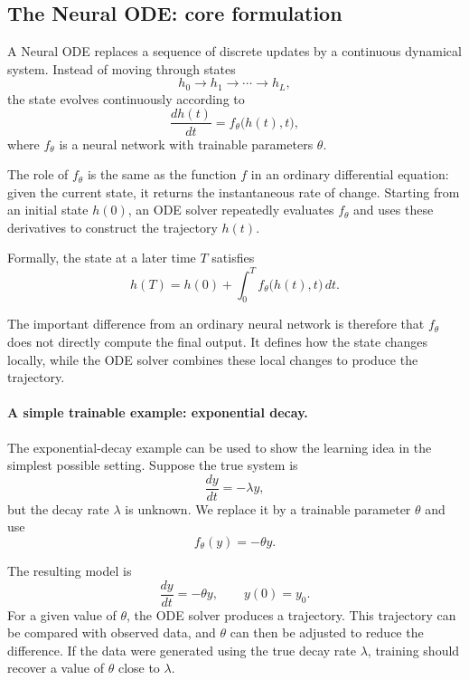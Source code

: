 \documentclass[11pt,a4paper]{article}
\begin{document}
\subsection{The Neural ODE: core formulation}

A Neural ODE replaces a sequence of discrete updates by a continuous
dynamical system. Instead of moving through states
\[
    h_0 \to h_1 \to \cdots \to h_L,
\]
the state evolves continuously according to
\begin{equation}
    \frac{dh(t)}{dt}
    =
    f_\theta\bigl(h(t),t\bigr),
    \label{eq:node}
\end{equation}
where $f_\theta$ is a neural network with trainable parameters $\theta$.

The role of $f_\theta$ is the same as the function $f$ in an ordinary
differential equation: given the current state, it returns the instantaneous
rate of change. Starting from an initial state $h(0)$, an ODE solver repeatedly
evaluates $f_\theta$ and uses these derivatives to construct the trajectory
$h(t)$.

Formally, the state at a later time $T$ satisfies
\begin{equation}
    h(T)
    =
    h(0)
    +
    \int_0^T
    f_\theta\bigl(h(t),t\bigr)\,dt .
    \label{eq:odesolve}
\end{equation}

The important difference from an ordinary neural network is therefore that
$f_\theta$ does not directly compute the final output. It defines how the
state changes locally, while the ODE solver combines these local changes to
produce the trajectory.

\paragraph{A simple trainable example: exponential decay.}

The exponential-decay example can be used to show the learning idea in the
simplest possible setting. Suppose the true system is
\[
    \frac{dy}{dt}=-\lambda y,
\]
but the decay rate $\lambda$ is unknown. We replace it by a trainable
parameter $\theta$ and use
\begin{equation}
    f_\theta(y)=-\theta y.
    \label{eq:toy-field}
\end{equation}

The resulting model is
\[
    \frac{dy}{dt}=-\theta y,
    \qquad
    y(0)=y_0.
\]
For a given value of $\theta$, the ODE solver produces a trajectory. This
trajectory can be compared with observed data, and $\theta$ can then be
adjusted to reduce the difference. If the data were generated using the true
decay rate $\lambda$, training should recover a value of $\theta$ close to
$\lambda$.
\end{document}
